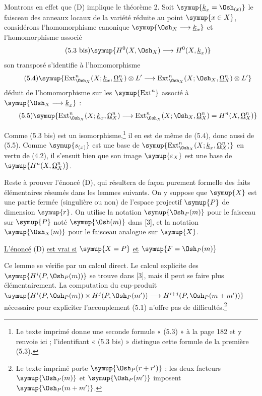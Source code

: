 Montrons en effet que (D) implique le théorème 2. Soit
$\symup{\underline{k}_x=\Osh_{(x)}}$ le faisceau des anneaux locaux de la variété réduite au point
$\symup{x\in X}$, considérons l'homomorphisme canonique
$\symup{\Osh_X\longrightarrow \underline{k}_x}$ et l'homomorphisme associé
\begin{equation}\tag{5.3 bis}
  \symup{H^{0}(X,\Osh_X)\longrightarrow H^{0}(X,\underline{k}_x)}
\end{equation}
son transposé s'identifie à l'homomorphisme
\begin{equation}\tag{5.4}
  \symup{\operatorname{Ext}_{\Osh_X}^{n}(X;\underline{k}_x,\underline{\Omega}_X^{n})\otimes L'
  \longrightarrow
  \operatorname{Ext}_{\Osh_X}^{n}(X;\Osh_X,\underline{\Omega}_X^{n})\otimes L'}
\end{equation}
déduit de l'homomorphisme sur les $\symup{\operatorname{Ext}^{n}}$ associé à
$\symup{\Osh_X\longrightarrow \underline{k}_x}$ :
\begin{equation}\tag{5.5}
  \symup{\operatorname{Ext}_{\Osh_X}^{n}(X;\underline{k}_x,\underline{\Omega}_X^{n})
  \longrightarrow
  \operatorname{Ext}_{\Osh_X}^{n}(X;\Osh_X,\underline{\Omega}_X^{n})
  =H^{n}(X,\underline{\Omega}_X^{n})}
\end{equation}

Comme (5.3 bis) est un isomorphisme,\footnote{Le texte imprimé donne une
seconde formule « (5.3) » à la page 182 et y renvoie ici ; l'identifiant
« (5.3 bis) » distingue cette formule de la première (5.3).} il en est de même
de (5.4), donc aussi de (5.5). Comme $\symup{s_{(x)}}$ est une base de
$\symup{\operatorname{Ext}_{\Osh_X}^{n}(X;\underline{k}_x,\underline{\Omega}_X^{n})}$ en vertu de (4.2), il
s'ensuit bien que son image $\symup{\varepsilon_X}$ est une base de
$\symup{H^{n}(X,\underline{\Omega}_X^{n})}$.

Reste à prouver l'énoncé (D), qui résultera de façon purement formelle des faits
élémentaires résumés dans les lemmes suivants. On y suppose que $\symup{X}$ est une
partie fermée (singulière ou non) de l'espace projectif $\symup{P}$ de dimension $\symup{r}$.
On utilise la notation $\symup{\Osh_P(m)}$ pour le faisceau sur $\symup{P}$ noté $\symup{\Osh(m)}$ dans
[3], et la notation $\symup{\Osh_X(m)}$ pour le faisceau analogue sur $\symup{X}$.

 \uline{L'énoncé} (D) \uline{est vrai si} $\symup{X=P}$ \uline{et} $\symup{F=\Osh_P(m)}$

Ce lemme se vérifie par un calcul direct. Le calcul explicite des
$\symup{H^{i}(P,\Osh_P(m))}$ se trouve dans [3], mais il peut se faire plus
élémentairement. La computation du cup-produit $\symup{H^{i}(P,\Osh_P(m))\times H^{j}(P,\Osh_P(m'))\longrightarrow H^{i+j}(P,\Osh_P(m+m'))}$ nécessaire pour expliciter l'accouplement (5.1) n'offre pas de
difficultés.\footnote{Le texte imprimé porte $\symup{\Osh_P(r+r')}$ ; les deux facteurs
$\symup{\Osh_P(m)}$ et $\symup{\Osh_P(m')}$ imposent $\symup{\Osh_P(m+m')}$.}

